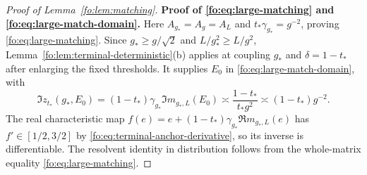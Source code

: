 \documentclass[11pt]{article}
\numberwithin{equation}{section}
\theoremstyle{remark}
\begin{document}
\begin{proof}[Proof of Lemma~\ref{fo:lem:matching}]
\noindent\textbf{Proof of \eqref{fo:eq:large-matching} and
\eqref{fo:eq:large-match-domain}.}
Here $A_{g_*}=A_g=A_L$ and $t_*\gamma_{g_*}=g^{-2}$, proving
\eqref{fo:eq:large-matching}. Since $g_*\ge g/\sqrt2$ and
$L/g_*^2\ge L/g^2$, Lemma~\ref{fo:lem:terminal-deterministic}(b)
applies at coupling $g_*$ and $\delta=1-t_*$ after enlarging the
fixed thresholds. It supplies $E_0$ in \eqref{fo:eq:large-match-domain}, with
\[
 \Im z_{t_*}(g_*,E_0)
 =(1-t_*)\gamma_{g_*}\Im m_{g_*,L}(E_0)
 \asymp\frac{1-t_*}{t_*g^2}\asymp(1-t_*)g^{-2}.
\]
The real characteristic map
$f(e)=e+(1-t_*)\gamma_{g_*}\Re m_{g_*,L}(e)$ has
$f'\in[1/2,3/2]$ by \eqref{fo:eq:terminal-anchor-derivative}, so its
inverse is differentiable. The resolvent identity in distribution
follows from the whole-matrix equality \eqref{fo:eq:large-matching}.
\end{proof}
\end{document}
